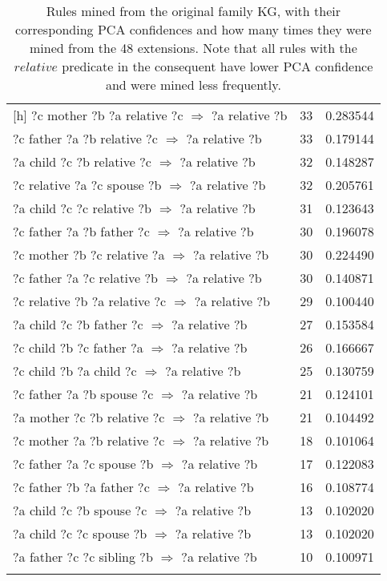 \begin{longtable}{lrr}[h]
  ?c  mother  ?b  ?a  relative  ?c   $\Rightarrow$ ?a  relative  ?b &           33 &        0.283544 \\
  ?c  father  ?a  ?b  relative  ?c   $\Rightarrow$ ?a  relative  ?b &           33 &        0.179144 \\
   ?a  child  ?c  ?b  relative  ?c   $\Rightarrow$ ?a  relative  ?b &           32 &        0.148287 \\
  ?c  relative  ?a  ?c  spouse  ?b   $\Rightarrow$ ?a  relative  ?b &           32 &        0.205761 \\
   ?a  child  ?c  ?c  relative  ?b   $\Rightarrow$ ?a  relative  ?b &           31 &        0.123643 \\
    ?c  father  ?a  ?b  father  ?c   $\Rightarrow$ ?a  relative  ?b &           30 &        0.196078 \\
  ?c  mother  ?b  ?c  relative  ?a   $\Rightarrow$ ?a  relative  ?b &           30 &        0.224490 \\
  ?c  father  ?a  ?c  relative  ?b   $\Rightarrow$ ?a  relative  ?b &           30 &        0.140871 \\
?c  relative  ?b  ?a  relative  ?c   $\Rightarrow$ ?a  relative  ?b &           29 &        0.100440 \\
     ?a  child  ?c  ?b  father  ?c   $\Rightarrow$ ?a  relative  ?b &           27 &        0.153584 \\
     ?c  child  ?b  ?c  father  ?a   $\Rightarrow$ ?a  relative  ?b &           26 &        0.166667 \\
      ?c  child  ?b  ?a  child  ?c   $\Rightarrow$ ?a  relative  ?b &           25 &        0.130759 \\
    ?c  father  ?a  ?b  spouse  ?c   $\Rightarrow$ ?a  relative  ?b &           21 &        0.124101 \\
  ?a  mother  ?c  ?b  relative  ?c   $\Rightarrow$ ?a  relative  ?b &           21 &        0.104492 \\
  ?c  mother  ?a  ?b  relative  ?c   $\Rightarrow$ ?a  relative  ?b &           18 &        0.101064 \\
    ?c  father  ?a  ?c  spouse  ?b   $\Rightarrow$ ?a  relative  ?b &           17 &        0.122083 \\
    ?c  father  ?b  ?a  father  ?c   $\Rightarrow$ ?a  relative  ?b &           16 &        0.108774 \\
     ?a  child  ?c  ?b  spouse  ?c   $\Rightarrow$ ?a  relative  ?b &           13 &        0.102020 \\
     ?a  child  ?c  ?c  spouse  ?b   $\Rightarrow$ ?a  relative  ?b &           13 &        0.102020 \\
   ?a  father  ?c  ?c  sibling  ?b   $\Rightarrow$ ?a  relative  ?b &           10 &        0.100971 \\
\bottomrule
\caption{Rules mined from the original family KG, with their corresponding PCA confidences and how many times they were mined from the 48 extensions. Note that all rules with the $relative$ predicate in the consequent have lower PCA confidence and were mined less frequently.}
\label{family_original_rules_table_frequencies}
\end{longtable}

